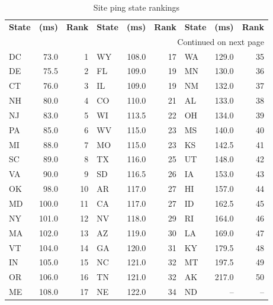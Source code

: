 \begin{table}[h]
    \centering
    \begin{tabular}{lrr|lrr|lrr}
    \textbf{State} & \textbf{(ms)} & \textbf{Rank} & \textbf{State} & \textbf{(ms)} & \textbf{Rank} & \textbf{State} & \textbf{(ms)} & \textbf{Rank} \\
    \multicolumn{9}{r}{{Continued on next page}} \\
    \hline
    DC    &    73.0 &     1     &  WY    &   108.0 &    17 &     WA    &   129.0 &    35 \\
    DE    &    75.5 &     2     &  FL    &   109.0 &    19 &     MN    &   130.0 &    36 \\
    CT    &    76.0 &     3     &  IL    &   109.0 &    19 &     NM    &   132.0 &    37 \\
    NH    &    80.0 &     4     &  CO    &   110.0 &    21 &     AL    &   133.0 &    38 \\
    NJ    &    83.0 &     5     &  WI    &   113.5 &    22 &     OH    &   134.0 &    39 \\
    PA    &    85.0 &     6     &  WV    &   115.0 &    23 &     MS    &   140.0 &    40 \\
    MI    &    88.0 &     7     &  MO    &   115.0 &    23 &     KS    &   142.5 &    41 \\
    SC    &    89.0 &     8     &  TX    &   116.0 &    25 &     UT    &   148.0 &    42 \\
    VA    &    90.0 &     9     &  SD    &   116.5 &    26 &     IA    &   153.0 &    43 \\
    OK    &    98.0 &    10     &  AR    &   117.0 &    27 &     HI    &   157.0 &    44 \\
    MD    &   100.0 &    11     &  CA    &   117.0 &    27 &     ID    &   162.5 &    45 \\
    NY    &   101.0 &    12     &  NV    &   118.0 &    29 &     RI    &   164.0 &    46 \\
    MA    &   102.0 &    13     &  AZ    &   119.0 &    30 &     LA    &   169.0 &    47 \\
    VT    &   104.0 &    14     &  GA    &   120.0 &    31 &     KY    &   179.5 &    48 \\
    IN    &   105.0 &    15     &  NC    &   121.0 &    32 &     MT    &   197.5 &    49 \\
    OR    &   106.0 &    16     &  TN    &   121.0 &    32 &     AK    &   217.0 &    50 \\
    ME    &   108.0 &    17     &  NE    &   122.0 &    34 &     ND    &      -- &    -- \\
    \end{tabular}
    \caption{Site ping state rankings}
    \label{tab:site_ping_state_rankings}
\end{table}
